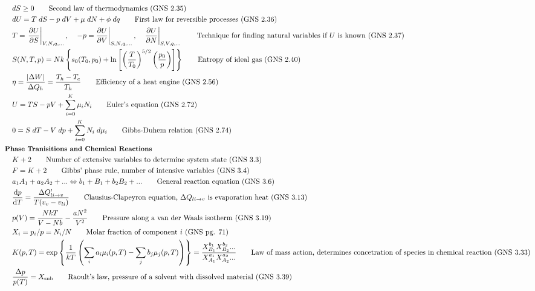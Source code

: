 \documentclass[10pt]{article}
\newcommand{\tder}[2]{\frac{\dd #1}{\dd #2}}
\newcommand{\pder}[2]{\frac{\partial #1}{\partial #2}}
\newcommand{\lrp}[1]{\left( #1 \right)}
\newcommand{\lrb}[1]{\left[ #1 \right]}
\newcommand{\lrc}[1]{\left\{ #1 \right\}}
\begin{document}
\begin{multicols}{2}
\begin{align*}
		& dS \geq 0	\tag*{Second law of thermodynamics (GNS 2.35)} \\
		& dU = T \; dS - p \; dV + \mu \; dN + \phi \; dq	\tag*{First law for reversible processes (GNS 2.36)} \\
		& T =  \left. \pder{U}{S} \right|_{V,N,q,...}, \quad \left. -p = \pder{U}{V}\right|_{S,N,q,...}, \quad \left. \pder{U}{N} \right|_{S,V,q,...}	\tag*{Technique for finding natural variables if $U$ is known (GNS 2.37)} \\
		& S(N,T,p) = Nk \lrc{s_0(T_0, p_0) + \ln \lrb{\lrp{\frac{T}{T_0}}^{5/2} \lrp{\frac{p_0}{p}}}}	\tag*{Entropy of ideal gas (GNS 2.40)} \\
		& \eta = \frac{|\Delta W|}{\Delta Q_h} = \frac{T_h-T_c}{T_h}	\tag*{Efficiency of a heat engine (GNS 2.56)} \\
		& U = TS - pV + \sum_{i=0}^K \mu_i N_i	\tag*{Euler's equation (GNS 2.72)} \\
		& 0 = S \; dT -V \; dp + \sum_{i=0}^K N_i \; d\mu_i	\tag*{Gibbs-Duhem relation (GNS 2.74)} \\
	& \small \hspace{-10pt} \textbf{Phase Tranisitions and Chemical Reactions} \small \\
		& K + 2	\tag*{Number of extensive variables to determine system state (GNS 3.3)}\\
		& F = K + 2	\tag*{Gibbs' phase rule, number of intensive variables (GNS 3.4)} \\
		& a_1 A_1 + a_2 A_2 + ... \Leftrightarrow b_1+B_1+b_2 B_2+...	\tag*{General reaction equation (GNS 3.6)} \\
		& \tder{p}{T} = \frac{\Delta Q'_{li \rightarrow v}}{T(v_v-v_{li})}	\tag*{Clausius-Clapeyron equation, $\Delta Q_{li\rightarrow v}$ is evaporation heat (GNS 3.13)} \\
		& p(V) = \frac{NkT}{V- Nb} - \frac{aN^2}{V^2}	\tag*{Pressure along a van der Waals isotherm (GNS 3.19)} \\
		& X_i = p_i/p = N_i/N	\tag*{Molar fraction of component $i$ (GNS pg. 71)} \\
		& K(p,T) = \exp \lrc{\frac{1}{kT} \lrp{\sum_i a_i \mu_i(p,T) - \sum_j b_j \mu_j(p,T)}} = \frac{X_{B_1}^{b_1} X_{B_2}^{b_2}...}{X_{A_1}^{a_1} X_{A_2}^{a_2}...} \tag*{Law of mass action, determines concetration of species in chemical reaction (GNS 3.33)} \\
		& \frac{\Delta p}{p(T)} = X_{\text{sub}}	\tag*{Raoult's law, pressure of a solvent with dissolved material (GNS 3.39)} \\

\end{align*}
\end{multicols}
\end{document}
